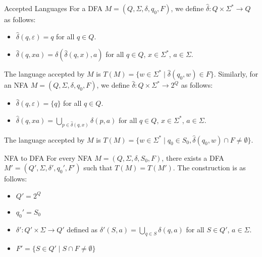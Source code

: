 \documentclass{beamer}
\begin{document}
\begin{frame}{Accepted Languages}
For a DFA $M=(Q,\Sigma,\delta,q_0,F)$, we define $\hat{\delta}:Q\times \Sigma^*\to Q$ as follows:
\begin{itemize}
    \item $\hat{\delta}(q,\varepsilon)=q$ for all $q\in Q$.
    \item $\hat{\delta}(q,xa)=\delta(\hat{\delta}(q,x),a)$ for all $q\in Q$, $x\in \Sigma^*$, $a\in \Sigma$.
\end{itemize}
The language accepted by $M$ is $T(M)=\{w\in \Sigma^*\mid \hat{\delta}(q_0,w)\in F\}$.
Similarly, for an NFA $M=(Q,\Sigma,\delta,q_0,F)$, we define $\hat{\delta}:Q\times \Sigma^*\to 2^Q$ as follows:
\begin{itemize}
    \item $\hat{\delta}(q,\varepsilon)=\{q\}$ for all $q\in Q$.
    \item   $\hat{\delta}(q,xa)=\bigcup_{p\in \hat{\delta}(q,x)}\delta(p,a)$ for all $q\in Q$, $x\in \Sigma^*$, $a\in \Sigma$.
    
\end{itemize}
The language accepted by $M$ is $T(M)=\{w\in \Sigma^*\mid q_0\in S_0,\hat{\delta}(q_0,w)\cap F\neq \emptyset\}$.
\end{frame}

\begin{frame}{NFA to DFA}
    For every NFA $M=(Q,\Sigma,\delta,S_0,F)$, there exists a DFA $M'=(Q',\Sigma,\delta',q_0',F')$ such that $T(M)=T(M')$. The construction is as follows:
    \begin{itemize}
        \item $Q'=2^Q$
        \item $q_0'=S_0$
        \item $\delta':Q'\times \Sigma\to Q'$ defined as $\delta'(S,a)=\bigcup_{q\in S}\delta(q,a)$ for all $S\in Q'$, $a\in \Sigma$.
        \item $F'=\{S\in Q' \mid S\cap F\neq \emptyset\}$
    \end{itemize}
\end{frame}

\end{document}
